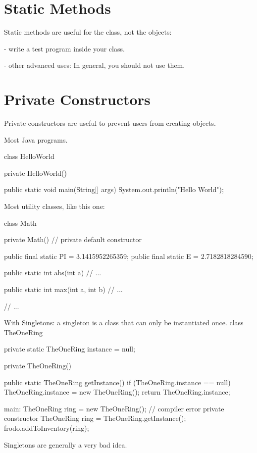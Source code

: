 \documentclass[a4paper, 9pt]{extarticle}
\begin{document}
\section{Static Methods}

Static methods are useful for the class, not the objects:

- write a test program inside your class.

- other advanced uses: In general, you should not use them.







\section{Private Constructors}

Private constructors are useful to prevent users from creating objects.

\begin{blackboard}
Most Java programs.

class HelloWorld {
  private HelloWorld() {
  }

  public static void main(String[] args) {
    System.out.println("Hello World");
  }
}

Most utility classes, like this one:

class Math {
  private Math() { // private default constructor
  }

  public final static PI = 3.1415952265359;
  public final static E = 2.7182818284590;

  public static int abs(int a) {
    // ...
  }

  public static int max(int a, int b) {
    // ...
  }

  // ...
}

With Singletons: a singleton is a class that can only be instantiated once.
class TheOneRing {
  private static TheOneRing instance = null;

  private TheOneRing() {
  }

  public static TheOneRing getInstance() {
    if (TheOneRing.instance == null) {
      TheOneRing.instance = new TheOneRing();
    }
    return TheOneRing.instance;
  }
}

main:
  TheOneRing ring = new TheOneRing(); // compiler error private constructor
  TheOneRing ring = TheOneRing.getInstance();
  frodo.addToInventory(ring);
\end{blackboard}

Singletons are generally a very bad idea.
\end{document}
